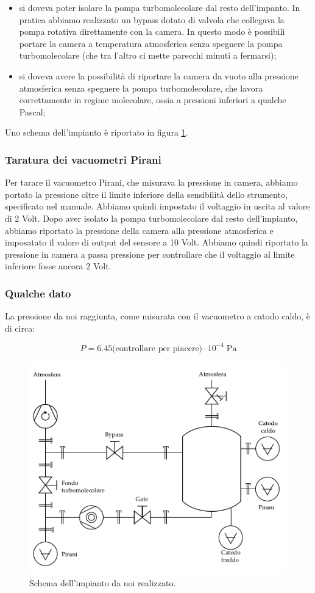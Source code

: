 \begin{itemize}
	\item{si doveva poter isolare la pompa turbomolecolare dal resto dell'impanto. In pratica abbiamo realizzato un bypass
    dotato di valvola che collegava la pompa rotativa direttamente con la camera. In questo modo è possibili portare la camera a
    temperatura atmosferica senza spegnere la pompa turbomolecolare (che tra l'altro ci mette parecchi minuti a fermarsi);}
	\item{si doveva avere la possibilità di riportare la camera da vuoto alla pressione atmosferica senza spegnere
    la pompa turbomolecolare, che lavora correttamente in regime molecolare, ossia a pressioni inferiori a qualche Pascal;}
\end{itemize}

Uno schema dell'impianto è riportato in figura \ref{fig:schema}.

\subsubsection{Taratura dei vacuometri Pirani}

Per tarare il vacuometro Pirani, che misurava la pressione in camera,
abbiamo portato la pressione oltre il limite inferiore
della sensibilità dello strumento, specificato nel manuale. Abbiamo quindi impostato il
voltaggio in uscita al valore di 2 Volt. Dopo aver isolato la pompa turbomolecolare dal resto
dell'impianto, abbiamo riportato la pressione della camera alla pressione atmosferica e
imposatato il valore di output del sensore a 10 Volt. Abbiamo quindi riportato la pressione in
camera a passa pressione per controllare che il voltaggio al limite inferiore fosse ancora 2 Volt.

\subsubsection{Qualche dato}

La pressione da noi raggiunta, come misurata con il vacuometro a catodo caldo, è di circa:

\begin{equation}
    P = 6.45 \text{(controllare per piacere)} \cdot 10^{-4} \; \si{\pascal}
\end{equation}

\begin{figure}[b!]
    \includegraphics[width=14.5cm]{drawing.pdf}
    \caption{Schema dell'impianto da noi realizzato.}
    \label{fig:schema}
\end{figure}
